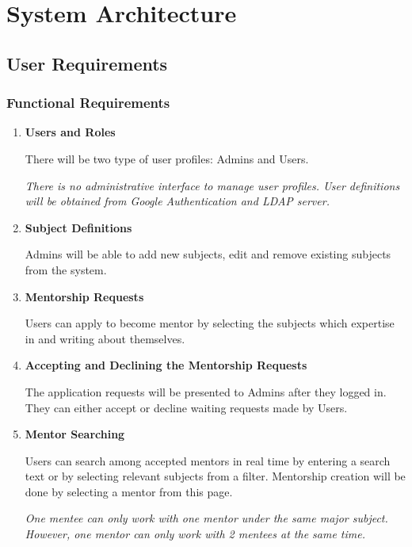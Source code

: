 \documentclass[10pt]{article}
\begin{document}
\section{System Architecture} \label{system_architecture}


\subsection{User Requirements} \label{user_requirements}


\subsubsection{Functional Requirements} \label{functional_requirements}
\begin{enumerate}

\item \textbf{Users and Roles}

There will be two type of user profiles: Admins and Users. 

\textit{There is no administrative interface to manage user profiles. User definitions
will be obtained from Google Authentication and LDAP server.}


\item \textbf{Subject Definitions}

Admins will be able to add new subjects, edit and remove existing subjects from the system.


\item \textbf{Mentorship Requests}

Users can apply to become mentor by selecting the subjects which expertise in and writing
about themselves.


\item \textbf{Accepting and Declining the Mentorship Requests}

The application requests will be presented to Admins after they logged in. They can either
accept or decline waiting requests made by Users.


\item \textbf{Mentor Searching}

Users can search among accepted mentors in real time by entering a search text or by selecting
relevant subjects from a filter. Mentorship creation will be done by selecting a mentor from
this page.

\textit{One mentee can only work with one mentor under the same major subject. However, 
one mentor can only work with 2 mentees at the same time.}



\end{enumerate}
\end{document}
